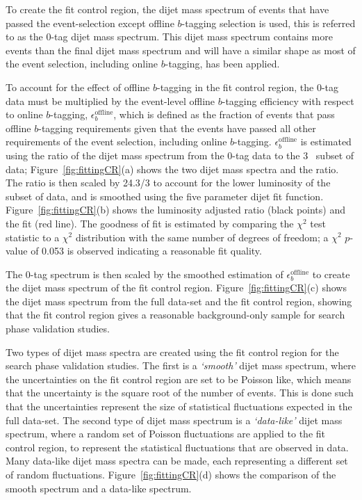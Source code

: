 To create the \lm{} fit control region,
the dijet mass spectrum of events that have passed the
\lm{} event-selection except offline $b$-tagging selection is used,
this is referred to as the 0-tag dijet mass spectrum.
This dijet mass spectrum contains more events than the final dijet mass spectrum
and will have a similar shape as most of the event selection, including online $b$-tagging, has been applied.

To account for the effect of offline $b$-tagging in the fit control region,
the 0-tag data must be multiplied by the event-level offline $b$-tagging efficiency with respect to online $b$-tagging, $\epsilon_b^{\text{offline}}$,
which is defined as the fraction of events that pass offline $b$-tagging requirements given
that the events have passed all other requirements of the \lm{} event selection, including online $b$-tagging.
$\epsilon_b^{\text{offline}}$ is estimated using the ratio
of the dijet mass spectrum from the 0-tag data to the 3~\ifb{} subset of data;
Figure~\ref{fig:fittingCR}(a) shows the two dijet mass spectra and the ratio.
The ratio is then scaled by 24.3/3 to account for the lower luminosity of the subset of data,
and is smoothed using the five parameter dijet fit function.
Figure~\ref{fig:fittingCR}(b) shows the luminosity adjusted ratio (black points) and the fit (red line).
The goodness of fit is estimated by comparing the $\chi^2$ test statistic to a $\chi^2$ distribution with the same number of degrees of freedom;
a $\chi^2$ $p$-value of 0.053 is observed indicating a reasonable fit quality.

The 0-tag spectrum is then scaled by the smoothed estimation of $\epsilon_b^{\text{offline}}$ to create the dijet mass spectrum of the fit control region.
Figure~\ref{fig:fittingCR}(c) shows the dijet mass spectrum from the full \lm{} data-set and the fit control region,
showing that the fit control region gives a reasonable background-only sample for search phase validation studies.

Two types of dijet mass spectra are created using the fit control region for the search phase validation studies.
The first is a \textit{`smooth'} dijet mass spectrum, where the uncertainties on the fit control region are set to be Poisson like,
which means that the uncertainty is the square root of the number of events.
This is done such that the uncertainties represent the size of statistical fluctuations expected in the full \lm{} data-set.
The second type of dijet mass spectrum is a \textit{`data-like'} dijet mass spectrum,
where a random set of Poisson fluctuations are applied to the fit control region,
to represent the statistical fluctuations that are observed in data.
Many data-like dijet mass spectra can be made, each representing a different set of random fluctuations.
Figure~\ref{fig:fittingCR}(d) shows the comparison of the smooth spectrum and a data-like spectrum.

